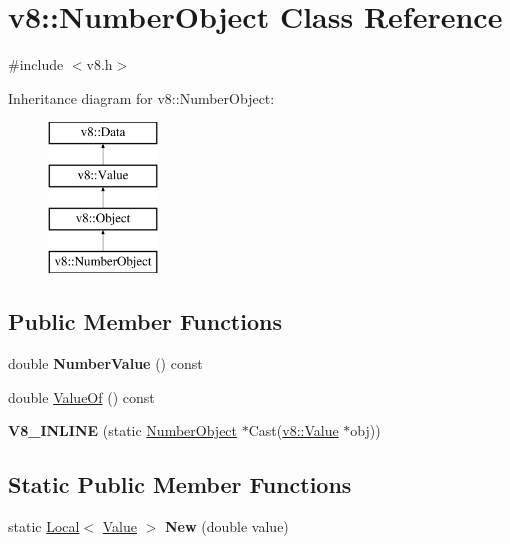 \hypertarget{classv8_1_1_number_object}{}\section{v8\+:\+:Number\+Object Class Reference}
\label{classv8_1_1_number_object}


{\ttfamily \#include $<$v8.\+h$>$}

Inheritance diagram for v8\+:\+:Number\+Object\+:\begin{figure}[H]
\begin{center}
\leavevmode
\includegraphics[height=4.000000cm]{classv8_1_1_number_object}
\end{center}
\end{figure}
\subsection*{Public Member Functions}
\begin{DoxyCompactItemize}
\item 
\hypertarget{classv8_1_1_number_object_ac8a39b55bb42047ace434bf7913f142a}{}double {\bfseries Number\+Value} () const \label{classv8_1_1_number_object_ac8a39b55bb42047ace434bf7913f142a}

\item 
double \hyperlink{classv8_1_1_number_object_a40c7211d55bc2de1b23f475d1906b5bf}{Value\+Of} () const 
\item 
\hypertarget{classv8_1_1_number_object_af8627ae8a973abb925b563309dfd74f8}{}{\bfseries V8\+\_\+\+I\+N\+L\+I\+N\+E} (static \hyperlink{classv8_1_1_number_object}{Number\+Object} $\ast$Cast(\hyperlink{classv8_1_1_value}{v8\+::\+Value} $\ast$obj))\label{classv8_1_1_number_object_af8627ae8a973abb925b563309dfd74f8}

\end{DoxyCompactItemize}
\subsection*{Static Public Member Functions}
\begin{DoxyCompactItemize}
\item 
\hypertarget{classv8_1_1_number_object_a751b0759d8e5758fdf568975b865587c}{}static \hyperlink{classv8_1_1_local}{Local}$<$ \hyperlink{classv8_1_1_value}{Value} $>$ {\bfseries New} (double value)\label{classv8_1_1_number_object_a751b0759d8e5758fdf568975b865587c}

\end{DoxyCompactItemize}



